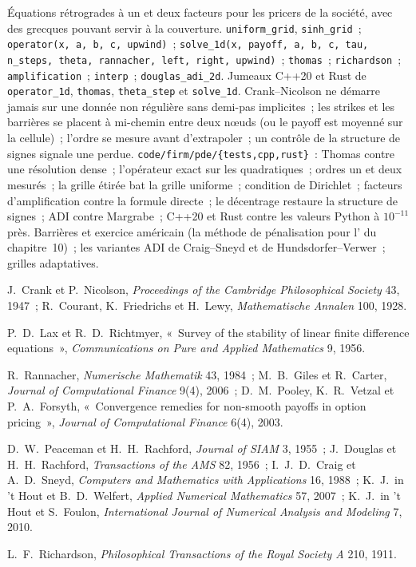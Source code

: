 \begin{build}
 Équations rétrogrades à un et deux facteurs pour les pricers de la société, avec des grecques pouvant servir à la couverture.
 \texttt{uniform\_grid}, \texttt{sinh\_grid}~; \texttt{operator(x, a, b, c, upwind)}~; \texttt{solve\_1d(x, payoff, a, b, c, tau, n\_steps, theta, rannacher, left, right, upwind)}~;
\texttt{thomas}~; \texttt{richardson}~; \texttt{amplification}~; \texttt{interp}~; \texttt{douglas\_adi\_2d}. Jumeaux C++20 et Rust de \texttt{operator\_1d}, \texttt{thomas}, \texttt{theta\_step} et
\texttt{solve\_1d}.
 Crank--Nicolson ne démarre jamais sur une donnée non régulière sans demi-pas implicites~; les strikes et les barrières se placent à mi-chemin entre deux nœuds (ou le payoff est moyenné sur la cellule)~; l'ordre se mesure avant
d'extrapoler~; un contrôle de la structure de signes signale une  perdue.
 \texttt{code/firm/pde/\{tests,cpp,rust\}}~: Thomas contre une résolution dense~; l'opérateur exact sur les quadratiques~; ordres un et deux mesurés~; la grille étirée bat la
grille uniforme~; condition de Dirichlet~; facteurs d'amplification contre la formule directe~; le décentrage restaure la structure de signes~; ADI contre Margrabe~; C++20 et Rust contre les valeurs Python à $10^{-11}$ près.
 Barrières et exercice américain (la méthode de pénalisation pour l' du chapitre~10)~; les variantes ADI de Craig--Sneyd et de Hundsdorfer--Verwer~; grilles adaptatives.
\end{build}

\begin{omsources}
\item J.~Crank et P.~Nicolson, \emph{Proceedings of the Cambridge Philosophical Society} 43, 1947~; R.~Courant, K.~Friedrichs et H.~Lewy, \emph{Mathematische Annalen} 100, 1928.
\item P.~D.~Lax et R.~D.~Richtmyer, «~Survey of the stability of linear finite difference equations~», \emph{Communications on Pure and Applied Mathematics} 9, 1956.
\item R.~Rannacher, \emph{Numerische Mathematik} 43, 1984~; M.~B.~Giles et R.~Carter, \emph{Journal of Computational Finance} 9(4), 2006~; D.~M.~Pooley, K.~R.~Vetzal et P.~A.~Forsyth, «~Convergence remedies
for non-smooth payoffs in option pricing~», \emph{Journal of Computational Finance} 6(4), 2003.
\item D.~W.~Peaceman et H.~H.~Rachford, \emph{Journal of SIAM} 3, 1955~; J.~Douglas et H.~H.~Rachford, \emph{Transactions of the AMS} 82, 1956~; I.~J.~D.~Craig et A.~D.~Sneyd, \emph{Computers and
Mathematics with Applications} 16, 1988~; K.~J.~in 't Hout et B.~D.~Welfert, \emph{Applied Numerical Mathematics} 57, 2007~; K.~J.~in 't Hout et S.~Foulon, \emph{International Journal of Numerical Analysis and Modeling} 7, 2010.
\item L.~F.~Richardson, \emph{Philosophical Transactions of the Royal Society A} 210, 1911.
\end{omsources}


